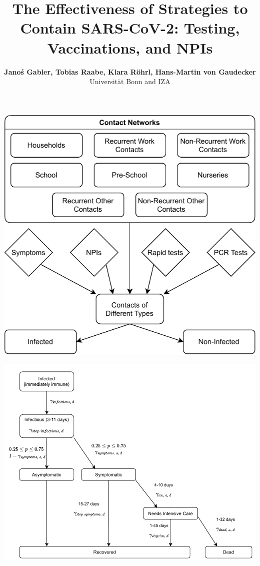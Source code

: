 \documentclass[11pt]{beamer}
\begin{document}
\title{The Effectiveness of Strategies to Contain SARS-CoV-2: Testing, Vaccinations, and NPIs}

\author[Janoś Gabler, Tobias Raabe, Klara Röhrl, Hans-Martin von Gaudecker]
{
{\bf Janoś Gabler, Tobias Raabe, Klara Röhrl, Hans-Martin von Gaudecker}\\
{\small Universität Bonn and IZA}\\[1ex]
}


\begin{frame}
    \titlepage
    \note{~}
\end{frame}


\begin{frame}
    \centering
    \includegraphics[height=.9\textheight]{figures/model-graph-top-left}
\end{frame}


\begin{frame}
    \centering
    \includegraphics[width=\textwidth]{figures/model-graph-top-right}
\end{frame}
\end{document}
